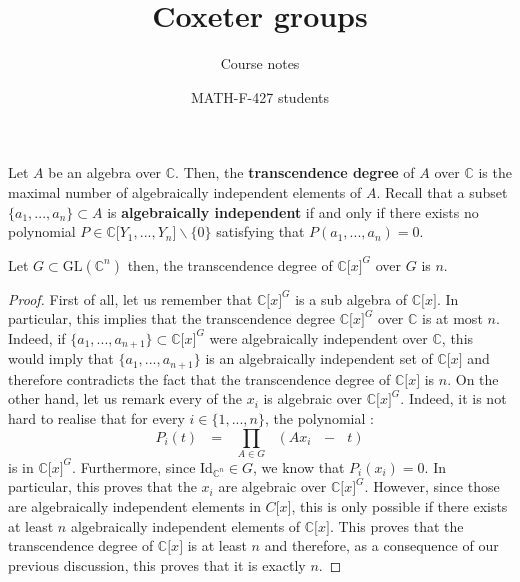 \documentclass[envcountsame,envcountchap]{svmono}
\newcommand{\C}{\mathbb C}
\newcommand{\tg}[1]{\textbf{#1}}
\newcommand{\sub}{\subset}
\newcommand{\lb}{\lbrack}
\newcommand{\rb}{\rbrack}
\newcommand{\qq}{\text{ }}
\begin{document}
\author{MATH-F-427 students}
\title{Coxeter groups}
\subtitle{Course notes}
\maketitle

\frontmatter%

\tableofcontents


\mainmatter%


\begin{definition}
	Let $A$ be an algebra over $\C$. Then, the \tg{transcendence degree} of $A$ over $\C$ is the maximal number of algebraically independent elements of $A$. Recall that a subset $\{a_1,...,a_n\}\sub A$ is \tg{algebraically independent} if and only if there exists no polynomial $P\in \C  \lb Y_1,...,Y_n\rb \backslash \{0\}$ satisfying that $P(a_1,...,a_n)=0$.	
\end{definition}

\begin{proposition}
	Let $G\sub \mbox{GL}(\C^n)$ then, the transcendence degree of $\C\lb x\rb^G$ over $G$ is $n$.
\end{proposition}
\begin{proof}
	First of all, let us remember that $\C\lb x\rb^G$ is a sub algebra of $\C\lb x\rb$. In particular, this implies that the transcendence degree $\C\lb x\rb^G$ over $\C$ is at most $n$. Indeed, if $\{a_1,...,a_{n+1}\}\sub \C\lb x\rb^G$ were algebraically independent over $\C$, this would imply that $\{a_1,...,a_{n+1}\}$ is an algebraically independent set of $\C\lb x\rb$ and therefore contradicts the fact that the transcendence degree of $\C\lb x\rb$ is $n$. On the other hand, let us remark every of the $x_i$ is algebraic over $\C \lb x\rb^G$. Indeed, it is not hard to realise that for every $i\in \{1,...,n\}$, the polynomial :
	\begin{equation}
	P_i(t)\qq=\qq \underset{A\in G}{\prod}\qq (A x_i\qq-\qq t)
	\end{equation}
	is in $\C\lb x\rb^G$. Furthermore, since $\mbox{Id}_{\C^n}\in G$, we know that $P_i(x_i)=0$. In particular, this proves that the $x_i$ are algebraic over $\C \lb x\rb^G$. However, since those are algebraically independent elements in $C\lb x\rb$, this is only possible if there exists at least $n$ algebraically independent elements of $\C \lb x\rb$. This proves that the transcendence degree of $\C \lb x\rb$ is at least $n$ and therefore, as a consequence of our previous discussion, this proves that it is exactly $n$.
\end{proof}
\end{document}
